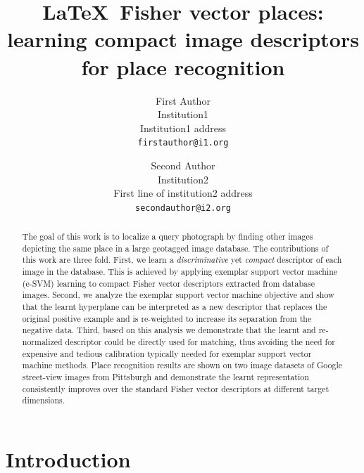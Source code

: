 \documentclass[10pt,twocolumn,letterpaper]{article}
\begin{document}
\title{\LaTeX\ Fisher vector places: learning compact image descriptors for place recognition}

\author{First Author\\
Institution1\\
Institution1 address\\
{\tt\small firstauthor@i1.org}
\and
Second Author\\
Institution2\\
First line of institution2 address\\
{\tt\small secondauthor@i2.org}
}

\maketitle

\begin{abstract}
   The goal of this work is to localize a query photograph by finding other images depicting the same place in a large geotagged image database. The contributions of this work are three fold. First, we learn a {\em discriminative} yet {\em compact} descriptor of each image in the database. This is achieved by applying exemplar support vector machine (e-SVM) learning to compact Fisher vector descriptors extracted from database images. Second, we analyze the exemplar support vector machine objective and show that the learnt hyperplane can be interpreted as a new descriptor that replaces the original positive example and is re-weighted to increase its separation from the negative data. Third, based on this analysis we demonstrate that the learnt and re-normalized descriptor could be directly used for matching, thus avoiding the need for expensive and tedious calibration typically needed for exemplar support vector machine methods. Place recognition results are shown on two image datasets of Google street-view images from Pittsburgh  and demonstrate the learnt representation consistently improves over the standard Fisher vector descriptors at different target dimensions. 
\end{abstract}

\section{Introduction}
\end{document}
